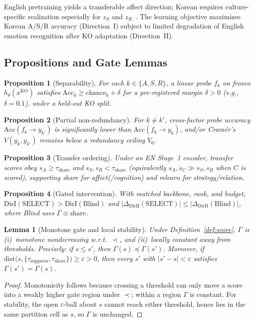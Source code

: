 \documentclass[journal]{IEEEtran}
\newtheorem{proposition}{Proposition}
\newtheorem{lemma}{Lemma}
\begin{document}
English pretraining yields a transferable affect direction; Korean requires culture-specific realization especially for $z_S$ and $z_R$~\cite{lee2025koed}.
The learning objective maximizes Korean A/S/R accuracy (Direction~I) subject to limited degradation of English emotion recognition after KO adaptation (Direction~II).

\subsection{Propositions and Gate Lemmas}
\begin{proposition}[Separability]
\label{prop:sep}
For each $k\in\{A,S,R\}$, a linear probe $f_k$ on frozen $h_\theta(x^{\mathrm{KO}})$ satisfies
$\mathrm{Acc}_k \ge \mathrm{chance}_k+\delta$ for a pre-registered margin $\delta>0$
(e.g., $\delta{=}0.1$), under a held-out KO split.
\end{proposition}

\begin{proposition}[Partial non-redundancy]
\label{prop:indep}
For $k\neq k'$, cross-factor probe accuracy $\mathrm{Acc}(f_k\!\to\! y_{k'})$ is significantly lower than $\mathrm{Acc}(f_k\!\to\! y_k)$,
and/or Cram\'{e}r's $V(y_k,y_{k'})$ remains below a redundancy ceiling $V_0$.
\end{proposition}

\begin{proposition}[Transfer ordering]
\label{prop:order}
Under an EN Stage~1 encoder, transfer scores obey
$s_A \ge \tau_{\mathrm{share}}$ and $s_S,s_R < \tau_{\mathrm{share}}$
(equivalently $s_A,s_C \gg s_S,s_R$ when $C$ is scored),
supporting share for affect(/cognition) and relearn for strategy/relation.
\end{proposition}

\begin{proposition}[Gated intervention]
\label{prop:intervene}
With matched backbone, rank, and budget,
$\mathrm{DirI}(\mathrm{SELECT})>\mathrm{DirI}(\mathrm{Blind})$
and
$|\Delta_{\mathrm{DirII}}(\mathrm{SELECT})|\le|\Delta_{\mathrm{DirII}}(\mathrm{Blind})|$,
where Blind uses $\Gamma\equiv\mathrm{share}$.
\end{proposition}

\begin{lemma}[Monotone gate and local stability]
\label{lem:gate}
Under Definition~\ref{def:score}, $\Gamma$ is (i)~monotone nondecreasing w.r.t.\ $\prec$, and (ii)~locally constant away from thresholds.
Precisely: if $s\le s'$, then $\Gamma(s)\preceq\Gamma(s')$.
Moreover, if
$\mathrm{dist}\!\big(s,\{\tau_{\mathrm{suppress}},\tau_{\mathrm{share}}\}\big)\ge\varepsilon>0$,
then every $s'$ with $|s'-s|<\varepsilon$ satisfies $\Gamma(s')=\Gamma(s)$.
\end{lemma}
\begin{proof}
Monotonicity follows because crossing a threshold can only move a score into a weakly higher gate region under $\prec$; within a region $\Gamma$ is constant.
For stability, the open $\varepsilon$-ball about $s$ cannot reach either threshold, hence lies in the same partition cell as $s$, so $\Gamma$ is unchanged.
\end{proof}
\end{document}
